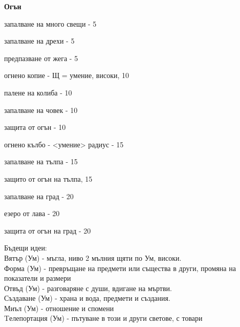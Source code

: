 \vspace{1cm}
\textbf{Огън}
\begin{itemize*}
  \item{запалване на много свещи - 5}
  \item{запалване на дрехи - 5}
  \item{предпазване от жега - 5}
  \item{огнено копие - Щ = умение, високи, 10}
  \item{палене на колиба - 10}
  \item{запалване на човек - 10}
  \item{защита от огън - 10}
  \item{огнено кълбо - <умение> радиус - 15}
  \item{запалване на тълпа - 15}
  \item{защито от огън на тълпа, 15}
  \item{запалване на град - 20}
  \item{езеро от лава - 20}
  \item{защита от огън на град - 20}
\end{itemize*}

Бъдещи идеи:  \\
Вятър (Ум)        - мъгла, ниво 2 мълния щяти по Ум, високи.                                         \\
Форма (Ум)        - превръщане на предмети или същества в други, промяна на показатели и размери     \\
Отвъд (Ум)        - разговаряне с души, вдигане на мъртви.                                           \\
Създаване (Ум)    - храна и вода, предмети и създания.                                               \\
Миъл (Ум)         - отношение и спомени                                                              \\
Tелепортация (Ум) - пътуване в този и други светове, с товари                                        \\


